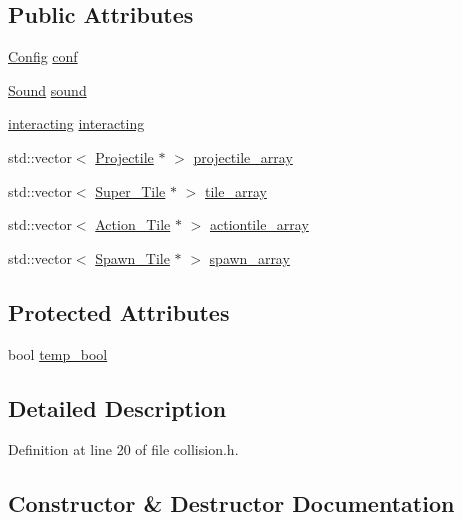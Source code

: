 \subsection*{Public Attributes}
\begin{DoxyCompactItemize}
\item 
\hyperlink{class_config}{Config} \hyperlink{class_collision_a1c9e4741260ced02eab1c9d49dc20aac}{conf}
\item 
\hyperlink{class_sound}{Sound} \hyperlink{class_collision_a9b9063978438db5e9502be4607986ebe}{sound}
\item 
\hyperlink{classinteracting}{interacting} \hyperlink{class_collision_a6ff0e49847948afeb0be0a1e5ded45c9}{interacting}
\item 
std\+::vector$<$ \hyperlink{class_projectile}{Projectile} $\ast$ $>$ \hyperlink{class_collision_a3828188ff3bdc4f1f4b5dbfc018552a8}{projectile\+\_\+array}
\item 
std\+::vector$<$ \hyperlink{class_super___tile}{Super\+\_\+\+Tile} $\ast$ $>$ \hyperlink{class_collision_aeccb982593f8dd6bb4c1d43198eb83d2}{tile\+\_\+array}
\item 
std\+::vector$<$ \hyperlink{class_action___tile}{Action\+\_\+\+Tile} $\ast$ $>$ \hyperlink{class_collision_a4faba0ed139ab4f637fe57b7d654ae65}{actiontile\+\_\+array}
\item 
std\+::vector$<$ \hyperlink{class_spawn___tile}{Spawn\+\_\+\+Tile} $\ast$ $>$ \hyperlink{class_collision_a5e65730ac3bebe98253379ed7aab0ec5}{spawn\+\_\+array}
\end{DoxyCompactItemize}
\subsection*{Protected Attributes}
\begin{DoxyCompactItemize}
\item 
bool \hyperlink{class_collision_aefd970d4b59cfd5ca8fd5d3675532f23}{temp\+\_\+bool}
\end{DoxyCompactItemize}


\subsection{Detailed Description}


Definition at line 20 of file collision.\+h.



\subsection{Constructor \& Destructor Documentation}
\hypertarget{class_collision_afb1cd1c725a04748829d2c1d813c2eec}{}\label{class_collision_afb1cd1c725a04748829d2c1d813c2eec} 
